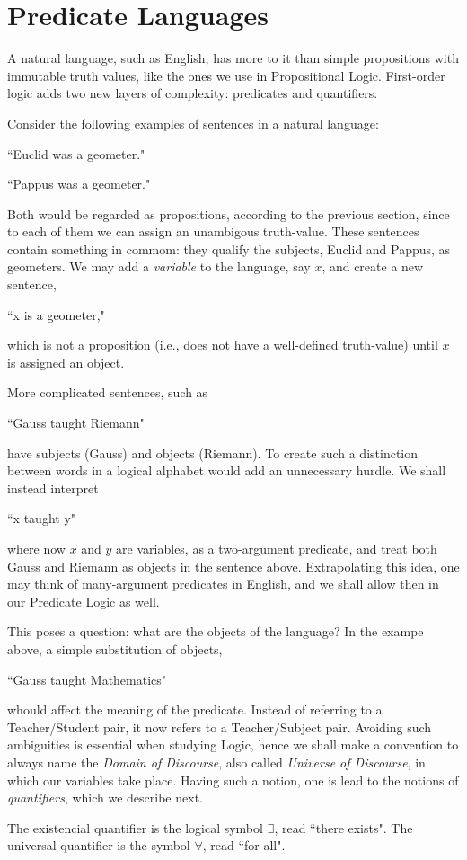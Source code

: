 \section{Predicate Languages}
A natural language, such as English, has more to it than simple propositions with immutable truth values, like the ones we use in Propositional Logic. First-order logic adds two new layers of complexity: predicates and quantifiers. 

Consider the following examples of sentences in a natural language:
\begin{center}
``Euclid was a geometer."
\end{center}
\begin{center}
``Pappus was a geometer."
\end{center}

Both would be regarded as propositions, according to the previous section, since to each of them we can assign an unambigous truth-value. These sentences contain something in commom: they qualify the subjects, Euclid and Pappus, as geometers. We may add a \textit{variable} to the language, say $x$, and create a new sentence, 
\begin{center}
``x is a geometer,"
\end{center}
which is not a proposition (i.e., does not have a well-defined truth-value) until $x$ is assigned an object.

More complicated sentences, such as 
\begin{center}
``Gauss taught Riemann"
\end{center}
have subjects (Gauss) and objects (Riemann). To create such a distinction between words in a logical alphabet would add an unnecessary hurdle. We shall instead interpret 
\begin{center}
``x taught y"
\end{center}
where now $x$ and $y$ are variables, as a two-argument predicate, and treat both Gauss and Riemann as objects in the sentence above. Extrapolating this idea, one may think of many-argument predicates in English, and we shall allow then in our Predicate Logic as well. 

This poses a question: what are the objects of the language? In the exampe above, a simple substitution of objects, 
\begin{center}
``Gauss taught Mathematics"
\end{center}
whould affect the meaning of the predicate. Instead of referring to a Teacher/Student pair, it now refers to a Teacher/Subject pair. Avoiding such ambiguities is essential when studying Logic, hence we shall make a convention to always name the \textit{Domain of Discourse}, also called \textit{Universe of Discourse}, in which our variables take place. Having such a notion, one is lead to the notions of \textit{quantifiers}, which we describe next.

\begin{definition}
The existencial quantifier is the logical symbol $\exists$, read ``there exists". The universal quantifier is the symbol $\forall$, read ``for all".
\end{definition}